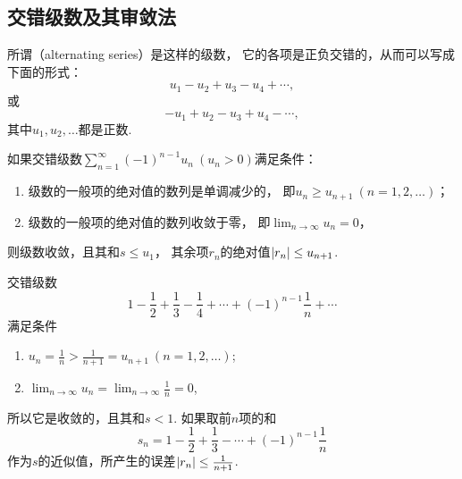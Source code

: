 
\subsection{交错级数及其审敛法}
所谓（alternating series）是这样的级数，
它的各项是正负交错的，从而可以写成下面的形式：\[
	u_1 - u_2 + u_3 - u_4 + \dotsb,
\]或\[
	-u_1 + u_2 - u_3 + u_4 - \dotsb,
\]
其中\(u_1,u_2,\dotsc\)都是正数.

\begin{theorem}[莱布尼茨定理]\label{theorem:无穷级数.莱布尼茨定理}
如果交错级数\(\sum_{n=1}^\infty (-1)^{n-1} u_n\ (u_n>0)\)满足条件：
\begin{enumerate}
\item 级数的一般项的绝对值的数列是单调减少的，
即\(u_n \geq u_{n+1}\ (n=1,2,\dotsc)\)；

\item 级数的一般项的绝对值的数列收敛于零，
即\(\lim_{n\to\infty} {u_n}=0\)，
\end{enumerate}
则级数收敛，且其和\(s \leq u_1\)，
其余项\(r_n\)的绝对值\(\abs{r_n} \leq u_{n+1}\).
\end{theorem}

\begin{example}\label{example:无穷级数.交错级数1}
交错级数\[
1 - \frac{1}{2} + \frac{1}{3} - \frac{1}{4} + \dotsb + (-1)^{n-1} \frac{1}{n} + \dotsb
\]满足条件\begin{enumerate}
\item \(u_n = \frac{1}{n} > \frac{1}{n+1} = u_{n+1}\ (n=1,2,\dotsc)\);
\item \(\lim_{n\to\infty} u_n = \lim_{n\to\infty} \frac{1}{n} = 0\),
\end{enumerate}所以它是收敛的，且其和\(s < 1\).
如果取前\(n\)项的和\[
s_n = 1 - \frac{1}{2} + \frac{1}{3} - \dotsb + (-1)^{n-1} \frac{1}{n}
\]作为\(s\)的近似值，所产生的误差\(\abs{r_n} \leq \frac{1}{n+1}\).
\end{example}

